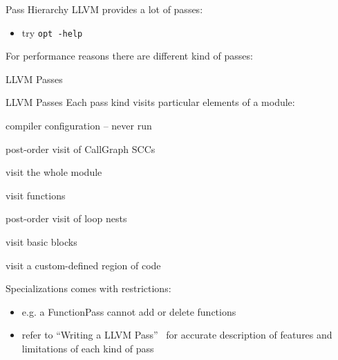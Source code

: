 \documentclass[10pt,mathserif]{beamer}
\begin{document}
\begin{frame}{Pass Hierarchy}
LLVM provides a lot of passes:

\begin{itemize}
\item try \texttt{\smaller opt -help}
\end{itemize}

\vfill
For performance reasons there are different kind of passes:

\begin{block}{LLVM Passes}

\centering
\end{block}
\end{frame}

\begin{frame}{LLVM Passes}
Each pass kind visits particular elements of a module:

\begin{description}[align=left, labelwidth=1cm]
\item[ImmutablePass] compiler configuration -- never run
\item[CallGraphSCCPass] post-order visit of CallGraph SCCs
\item[ModulePass] visit the whole module
\item[FunctionPass] visit functions
\item[LoopPass] post-order visit of loop nests
\item[BasicBlockPass] visit basic blocks
\item[RegionPass] visit a custom-defined region of code
\end{description}

\vfill
Specializations comes with restrictions:

\begin{itemize}
\item e.g. a \alert{FunctionPass} cannot add or delete functions
\item refer to ``Writing a LLVM Pass''~\cite{LOCAL:www/llvmWritingAPass}
      for accurate description of features and limitations of each kind of pass
\end{itemize}
\end{frame}

%
%
%
%
\end{document}
